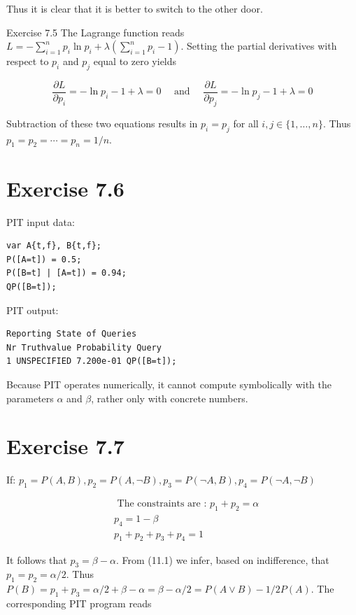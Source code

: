 \documentclass[10pt]{article}
\begin{document}
Thus it is clear that it is better to switch to the other door.

Exercise 7.5 The Lagrange function reads $L=-\sum_{i=1}^{n} p_{i} \ln p_{i}+\lambda\left(\sum_{i=1}^{n} p_{i}-1\right)$. Setting the partial derivatives with respect to $p_{i}$ and $p_{j}$ equal to zero yields

$$
\frac{\partial L}{\partial p_{i}}=-\ln p_{i}-1+\lambda=0 \quad \text { and } \quad \frac{\partial L}{\partial p_{j}}=-\ln p_{j}-1+\lambda=0
$$

Subtraction of these two equations results in $p_{i}=p_{j}$ for all $i, j \in\{1, \ldots, n\}$. Thus $p_{1}=p_{2}=\cdots=p_{n}=1 / n$.

\section*{Exercise 7.6}
PIT input data:

\begin{verbatim}
var A{t,f}, B{t,f};
P([A=t]) = 0.5;
P([B=t] | [A=t]) = 0.94;
QP([B=t]);
\end{verbatim}

PIT output:

\begin{verbatim}
Reporting State of Queries
Nr Truthvalue Probability Query
1 UNSPECIFIED 7.200e-01 QP([B=t]);
\end{verbatim}

Because PIT operates numerically, it cannot compute symbolically with the parameters $\alpha$ and $\beta$, rather only with concrete numbers.

\section*{Exercise 7.7}
If: $p_{1}=P(A, B), p_{2}=P(A, \neg B), p_{3}=P(\neg A, B), p_{4}=P(\neg A, \neg B)$


\begin{align*}
& \text { The constraints are : } p_{1}+p_{2}=\alpha  \tag{11.1}\\
& p_{4}=1-\beta  \tag{11.2}\\
& p_{1}+p_{2}+p_{3}+p_{4}=1 \tag{11.3}
\end{align*}


It follows that $p_{3}=\beta-\alpha$. From (11.1) we infer, based on indifference, that $p_{1}=p_{2}=\alpha / 2$. Thus $P(B)=p_{1}+p_{3}=\alpha / 2+\beta-\alpha=\beta-\alpha / 2=P(A \vee B)-1 / 2 P(A)$. The corresponding PIT program reads
\end{document}
